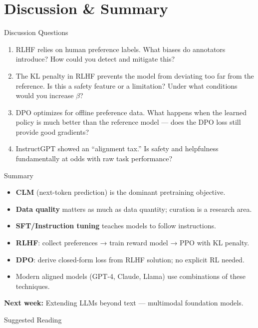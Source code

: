 \documentclass[aspectratio=169,10pt]{beamer}
\begin{document}
\section{Discussion \& Summary}
\begin{frame}{Discussion Questions}
  \begin{enumerate}
    \item RLHF relies on human preference labels. What biases do annotators introduce?
          How could you detect and mitigate this?
    \item The KL penalty in RLHF prevents the model from deviating too far from the reference.
          Is this a safety feature or a limitation? Under what conditions would you increase $\beta$?
    \item DPO optimizes for offline preference data. What happens when the learned policy is much
          better than the reference model — does the DPO loss still provide good gradients?
    \item InstructGPT showed an ``alignment tax.'' Is safety and helpfulness fundamentally at odds
          with raw task performance?
  \end{enumerate}
\end{frame}

\begin{frame}{Summary}
  \begin{itemize}
    \item \textbf{CLM} (next-token prediction) is the dominant pretraining objective.
    \item \textbf{Data quality} matters as much as data quantity; curation is a research area.
    \item \textbf{SFT/Instruction tuning} teaches models to follow instructions.
    \item \textbf{RLHF}: collect preferences → train reward model → PPO with KL penalty.
    \item \textbf{DPO}: derive closed-form loss from RLHF solution; no explicit RL needed.
    \item Modern aligned models (GPT-4, Claude, Llama) use combinations of these techniques.
  \end{itemize}
  \vspace{0.3em}
  \textbf{Next week:} Extending LLMs beyond text — multimodal foundation models.
\end{frame}

\begin{frame}[allowframebreaks]{Suggested Reading}
  \nocite{ouyang2022training, rafailov2023direct, wei2022finetuned,
          brown2020language, touvron2023llama2}
  
\end{frame}
\end{document}
